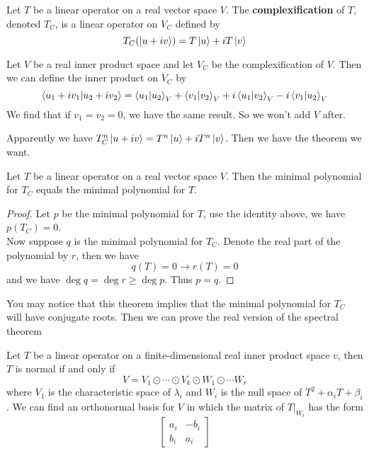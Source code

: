 \documentclass{article}
\begin{document}
\begin{dde}
	Let $T$ be a linear operator on a real vector space $V$. The \textbf{complexification} of $T$, denoted $T_C$, is a linear operator on $V_C$ defined by
	\[T_C(\ket{u+iv})=T\ket{u}+iT\ket{v}\]
\end{dde}
\begin{dde}
	Let $V$ be a real inner product space and let $V_C$ be the complexification of $V$. Then we can define the inner product on $V_C$ by 
	\[\braket{u_1+iv_1|u_2+iv_2}=\braket{u_1|u_2}_V+\braket{v_1|v_2}_V+i\braket{u_1|v_2}_V-i\braket{v_1|u_2}_V\]
	We find that if $v_1=v_2=0$, we have the same result. So we won't add $V$ after.
\end{dde}
Apparently we have $T_C^n\ket{u+iv}=T^n\ket{u}+iT^n\ket{v}$. Then we have the theorem we want.
\begin{thm}
	Let $T$ be a linear operator on a real vector space $V$. Then the minimal polynomial for $T_C$ equals the minimal polynomial for $T$.
\end{thm}
\begin{proof}
	Let $p$ be the minimal polynomial for $T$, use the identity above, we have $p(T_C)=0$.\\
	Now suppose $q$ is the minimal polynomial for $T_C$. Denote the real part of the polynomial by $r$, then we have
	\[q(T)=0\rightarrow r(T)=0\]
	and we have $\deg q=\deg r\ge \deg p$. Thus $p=q$.
\end{proof}
You may notice that this theorem implies that the minimal polynomial for $T_C$ will have conjugate roots. Then we can prove the real version of the spectral theorem
\begin{thm}
	Let $T$ be a linear operator on a finite-dimensional real inner product space $v$, then $T$ is normal if and only if 
	\[V=V_1\odot\cdots\odot V_k\odot W_1\odot\cdots W_r\]
	where $V_1$ is the characteristic space of $\lambda_i$ and $W_i$ is the null space of $T^2+\alpha_iT+\beta_i$. We can find an orthonormal basis for $V$ in which the matrix of $T|_{W_i}$ has the form
	\[\begin{bmatrix}
		a_i&-b_i\\
		b_i&a_i
	\end{bmatrix}\]
\end{thm}
\end{document}
